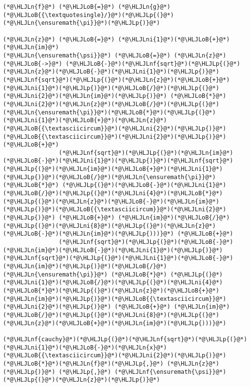 \documentclass[12pt,a4paper]{article}
\newcommand{\HLJLn}[1]{#1}
\newcommand{\HLJLnf}[1]{\textcolor[RGB]{66,102,213}{#1}}
\newcommand{\HLJLni}[1]{\textcolor[RGB]{59,151,46}{#1}}
\newcommand{\HLJLoB}[1]{\textcolor[RGB]{102,102,102}{\textbf{#1}}}
\newcommand{\HLJLp}[1]{#1}
\begin{document}
\begin{lstlisting}
(*@\HLJLn{f}@*) (*@\HLJLoB{=}@*) (*@\HLJLn{g}@*)(*@\HLJLoB{{\textquotesingle}/}@*)(*@\HLJLp{(}@*)(*@\HLJLn{\ensuremath{\pi}}@*)(*@\HLJLp{)}@*)

(*@\HLJLn{z}@*) (*@\HLJLoB{=}@*) (*@\HLJLni{1}@*)(*@\HLJLoB{+}@*)(*@\HLJLn{im}@*)
(*@\HLJLn{\ensuremath{\psi}}@*) (*@\HLJLoB{=}@*) (*@\HLJLn{z}@*) (*@\HLJLoB{->}@*) (*@\HLJLoB{-}@*)(*@\HLJLnf{sqrt}@*)(*@\HLJLp{(}@*)(*@\HLJLn{z}@*)(*@\HLJLoB{-}@*)(*@\HLJLni{1}@*)(*@\HLJLp{)}@*)(*@\HLJLnf{sqrt}@*)(*@\HLJLp{(}@*)(*@\HLJLn{z}@*)(*@\HLJLoB{+}@*)(*@\HLJLni{1}@*)(*@\HLJLp{)}@*)(*@\HLJLoB{/}@*)(*@\HLJLp{(}@*)(*@\HLJLni{2}@*)(*@\HLJLn{im}@*)(*@\HLJLp{)}@*) (*@\HLJLoB{*}@*) (*@\HLJLni{2}@*)(*@\HLJLn{z}@*)(*@\HLJLoB{/}@*)(*@\HLJLp{(}@*)(*@\HLJLn{\ensuremath{\pi}}@*)(*@\HLJLoB{*}@*)(*@\HLJLp{(}@*)(*@\HLJLni{1}@*)(*@\HLJLoB{+}@*)(*@\HLJLn{z}@*)(*@\HLJLoB{{\textasciicircum}}@*)(*@\HLJLni{2}@*)(*@\HLJLp{)}@*)(*@\HLJLoB{{\textasciicircum}}@*)(*@\HLJLni{2}@*)(*@\HLJLp{)}@*) (*@\HLJLoB{+}@*)
                (*@\HLJLnf{sqrt}@*)(*@\HLJLp{(}@*)(*@\HLJLn{im}@*)(*@\HLJLoB{-}@*)(*@\HLJLni{1}@*)(*@\HLJLp{)}@*)(*@\HLJLnf{sqrt}@*)(*@\HLJLp{(}@*)(*@\HLJLn{im}@*)(*@\HLJLoB{+}@*)(*@\HLJLni{1}@*)(*@\HLJLp{)}@*)(*@\HLJLoB{/}@*)(*@\HLJLn{\ensuremath{\pi}}@*) (*@\HLJLoB{*}@*) (*@\HLJLp{(}@*)(*@\HLJLoB{-}@*)(*@\HLJLni{1}@*)(*@\HLJLoB{/}@*)(*@\HLJLp{(}@*)(*@\HLJLni{4}@*)(*@\HLJLoB{*}@*)(*@\HLJLp{(}@*)(*@\HLJLn{z}@*)(*@\HLJLoB{-}@*)(*@\HLJLn{im}@*)(*@\HLJLp{)}@*)(*@\HLJLoB{{\textasciicircum}}@*)(*@\HLJLni{2}@*)(*@\HLJLp{)}@*) (*@\HLJLoB{+}@*) (*@\HLJLn{im}@*)(*@\HLJLoB{/}@*)(*@\HLJLp{(}@*)(*@\HLJLni{8}@*)(*@\HLJLp{(}@*)(*@\HLJLn{z}@*)(*@\HLJLoB{-}@*)(*@\HLJLn{im}@*)(*@\HLJLp{)))}@*) (*@\HLJLoB{+}@*)
                (*@\HLJLnf{sqrt}@*)(*@\HLJLp{(}@*)(*@\HLJLoB{-}@*)(*@\HLJLn{im}@*)(*@\HLJLoB{-}@*)(*@\HLJLni{1}@*)(*@\HLJLp{)}@*)(*@\HLJLnf{sqrt}@*)(*@\HLJLp{(}@*)(*@\HLJLni{1}@*)(*@\HLJLoB{-}@*)(*@\HLJLn{im}@*)(*@\HLJLp{)}@*)(*@\HLJLoB{/}@*)(*@\HLJLn{\ensuremath{\pi}}@*) (*@\HLJLoB{*}@*) (*@\HLJLp{(}@*)(*@\HLJLni{1}@*)(*@\HLJLoB{/}@*)(*@\HLJLp{(}@*)(*@\HLJLni{4}@*)(*@\HLJLoB{*}@*)(*@\HLJLp{(}@*)(*@\HLJLn{z}@*)(*@\HLJLoB{+}@*)(*@\HLJLn{im}@*)(*@\HLJLp{)}@*)(*@\HLJLoB{{\textasciicircum}}@*)(*@\HLJLni{2}@*)(*@\HLJLp{)}@*) (*@\HLJLoB{+}@*) (*@\HLJLn{im}@*)(*@\HLJLoB{/}@*)(*@\HLJLp{(}@*)(*@\HLJLni{8}@*)(*@\HLJLp{(}@*)(*@\HLJLn{z}@*)(*@\HLJLoB{+}@*)(*@\HLJLn{im}@*)(*@\HLJLp{)))}@*)

(*@\HLJLnf{cauchy}@*)(*@\HLJLp{(}@*)(*@\HLJLnf{sqrt}@*)(*@\HLJLp{(}@*)(*@\HLJLni{1}@*)(*@\HLJLoB{-}@*)(*@\HLJLn{x}@*)(*@\HLJLoB{{\textasciicircum}}@*)(*@\HLJLni{2}@*)(*@\HLJLp{)}@*)(*@\HLJLoB{*}@*)(*@\HLJLn{f}@*)(*@\HLJLp{,}@*) (*@\HLJLn{z}@*)(*@\HLJLp{)}@*) (*@\HLJLp{,}@*) (*@\HLJLnf{\ensuremath{\psi}}@*)(*@\HLJLp{(}@*)(*@\HLJLn{z}@*)(*@\HLJLp{)}@*)
\end{lstlisting}
\end{document}
